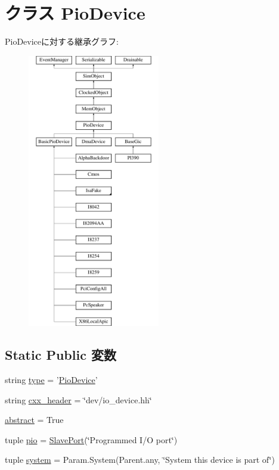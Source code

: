 \hypertarget{classDevice_1_1PioDevice}{
\section{クラス PioDevice}
\label{classDevice_1_1PioDevice}
}
PioDeviceに対する継承グラフ:\begin{figure}[H]
\begin{center}
\leavevmode
\includegraphics[height=12cm]{classDevice_1_1PioDevice}
\end{center}
\end{figure}
\subsection*{Static Public 変数}
\begin{DoxyCompactItemize}
\item 
string \hyperlink{classDevice_1_1PioDevice_acce15679d830831b0bbe8ebc2a60b2ca}{type} = '\hyperlink{classDevice_1_1PioDevice}{PioDevice}'
\item 
string \hyperlink{classDevice_1_1PioDevice_a17da7064bc5c518791f0c891eff05fda}{cxx\_\-header} = \char`\"{}dev/io\_\-device.hh\char`\"{}
\item 
\hyperlink{classDevice_1_1PioDevice_a17fa61ac3806b481cafee5593b55e5d0}{abstract} = True
\item 
tuple \hyperlink{classDevice_1_1PioDevice_a4b2bf1690cc3261b071d85c69ddcbcdc}{pio} = \hyperlink{classm5_1_1params_1_1SlavePort}{SlavePort}(\char`\"{}Programmed I/O port\char`\"{})
\item 
tuple \hyperlink{classDevice_1_1PioDevice_ab737471139f5a296e5b26e8a0e1b0744}{system} = Param.System(Parent.any, \char`\"{}System this device is part of\char`\"{})
\end{DoxyCompactItemize}


